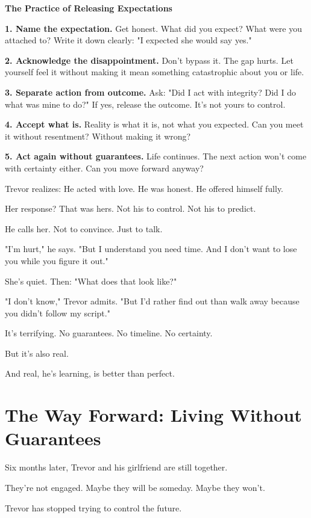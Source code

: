 \documentclass[11pt,twoside]{book}
\begin{document}
\begin{practicebox}
\textbf{The Practice of Releasing Expectations}

\textbf{1. Name the expectation.} Get honest. What did you expect? What were you attached to? Write it down clearly: "I expected she would say yes."

\textbf{2. Acknowledge the disappointment.} Don't bypass it. The gap hurts. Let yourself feel it without making it mean something catastrophic about you or life.

\textbf{3. Separate action from outcome.} Ask: "Did I act with integrity? Did I do what was mine to do?" If yes, release the outcome. It's not yours to control.

\textbf{4. Accept what is.} Reality is what it is, not what you expected. Can you meet it without resentment? Without making it wrong?

\textbf{5. Act again without guarantees.} Life continues. The next action won't come with certainty either. Can you move forward anyway?
\end{practicebox}

Trevor realizes: He acted with love. He was honest. He offered himself fully.

Her response? That was hers. Not his to control. Not his to predict.

He calls her. Not to convince. Just to talk.

"I'm hurt," he says. "But I understand you need time. And I don't want to lose you while you figure it out."

She's quiet. Then: "What does that look like?"

"I don't know," Trevor admits. "But I'd rather find out than walk away because you didn't follow my script."

It's terrifying. No guarantees. No timeline. No certainty.

But it's also real.

And real, he's learning, is better than perfect.

\section*{The Way Forward: Living Without Guarantees}

Six months later, Trevor and his girlfriend are still together.

They're not engaged. Maybe they will be someday. Maybe they won't.

Trevor has stopped trying to control the future.
\end{document}
